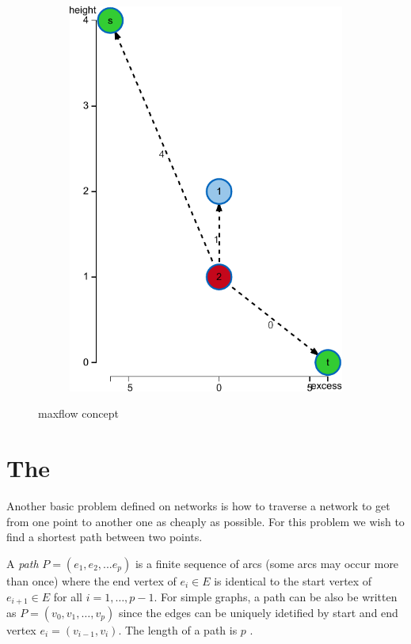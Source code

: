 \begin{figure}
\begin{subfigure}[t]{0.45\textwidth}
\includegraphics[width=\textwidth]{fig/maxflow-graph-algorithm-height}
\end{subfigure}
\caption{maxflow concept}
\label{fig:maxflow}
\end{figure}





\section{The \spprc{}}
Another basic problem defined on networks is how to traverse a network to get from one point to another one as cheaply as possible. For this problem we wish to find a shortest path between two points.

\begin{definition}[path]
A \textit{path} $P = (e_1, e_2, ... e_p)$ is a finite sequence of arcs (some arcs may occur more than once) where the end vertex of $e_i \in E$ is identical to the start vertex of $e_{i+1} \in E$ for all $i=1,\dots,p-1$. For simple graphs, a path can be also be written as $P = (v_0,v_1,\dots,v_p)$ since the edges can be uniquely idetified by start and end vertex $e_i=(v_{i-1},v_i)$. The length of a path is $p$ \cite{irnich2005shortest}.
\end{definition}


